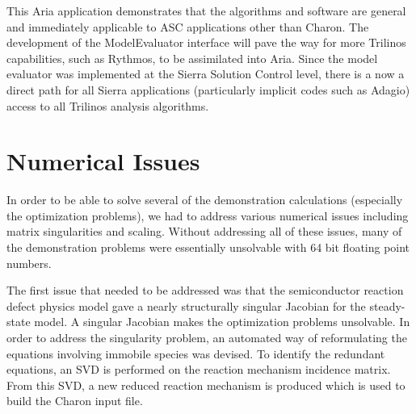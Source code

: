 \documentclass[pdf,ps2pdf,11pt]{SANDreport}
\begin{document}
{This Aria application demonstrates that the algorithms and software are
general and immediately applicable to ASC applications other than Charon. The
development of the ModelEvaluator interface will pave the way for more
Trilinos capabilities, such as Rythmos, to be assimilated into Aria. Since the
model evaluator was implemented at the Sierra Solution Control level, there is
a now a direct path for all Sierra applications (particularly implicit codes
such as Adagio) access to all Trilinos analysis algorithms.


%
\section{Numerical Issues}
%

In order to be able to solve several of the demonstration calculations
(especially the optimization problems), we had to address various numerical
issues including matrix singularities and scaling.  Without addressing all of
these issues, many of the demonstration problems were essentially unsolvable
with 64 bit floating point numbers.

The first issue that needed to be addressed was that the semiconductor
reaction defect physics model gave a nearly structurally singular Jacobian for
the steady-state model.  A singular Jacobian makes the optimization problems
unsolvable.  In order to address the singularity problem, an automated way of
reformulating the equations involving immobile species was devised.  To
identify the redundant equations, an SVD is performed on the reaction mechanism
incidence matrix.  From this SVD, a new reduced reaction mechanism is produced
which is used to build the Charon input file. 

}
\end{document}
